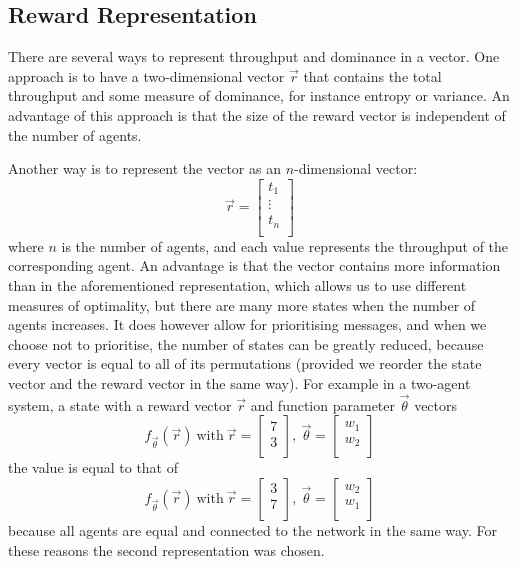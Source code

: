 \documentclass{article}
\begin{document}
\begin{multicols}{2}
		\subsection{Reward Representation}
		\label{sub:reward_representation}
		There are several ways to represent throughput and dominance in a vector.
		One approach is to have a two-dimensional vector $\vec{r}$ that contains
		the total throughput and some measure of dominance, for instance entropy
		or variance. An advantage of this approach is that the size of the reward
		vector is independent of the number of agents.

		Another way is to represent the vector as an $n$-dimensional vector:
		$$\vec{r} = \begin{bmatrix}
			t_1\\
			\vdots\\
			t_n\\
		\end{bmatrix}$$
		where $n$ is the number of agents, and each value represents the
		throughput of the corresponding agent. An advantage is that the vector
		contains more information than in the aforementioned representation,
		which allows us to use different measures of optimality, but
		there are many more states when the number of agents increases. It does
		however allow for prioritising messages, and when we choose not to
		prioritise, the number of states can be greatly reduced, because every
		vector is equal to all of its permutations (provided we reorder the state
		vector and the reward vector in the same way).
		For example in a two-agent system, a state with a reward vector $\vec{r}$
		and function parameter $\vec{\theta}$
		vectors
		$$ f_{\vec{\theta}}(\vec{r})~\textrm{with}~\vec{r} = \begin{bmatrix}
			7\\
			3\\
		\end{bmatrix},~
		\vec{\theta} = \begin{bmatrix}
			w_1\\
			w_2\\
		\end{bmatrix}$$
		the value is equal to that of
		$$ f_{\vec{\theta}}(\vec{r})~\textrm{with}~\vec{r} = \begin{bmatrix}
			3\\
			7\\
		\end{bmatrix},~
		\vec{\theta} = \begin{bmatrix}
			w_2\\
			w_1\\
		\end{bmatrix}$$
		because all agents are equal and connected to the network in the same
		way.
		For these reasons the second representation was chosen.


\end{multicols}
\end{document}
